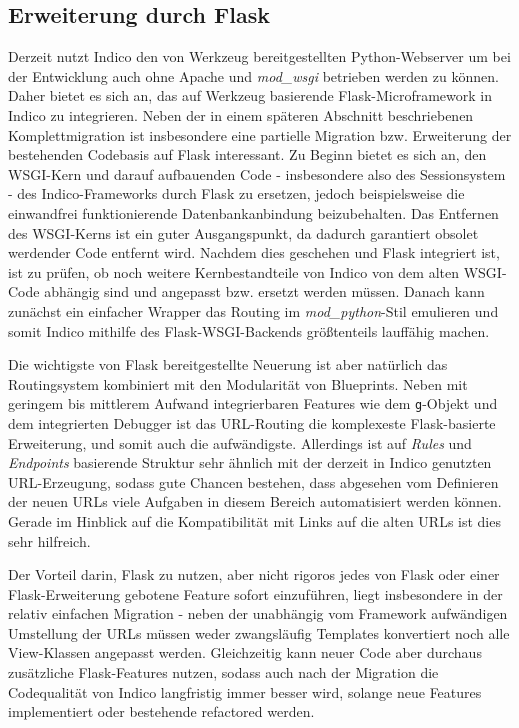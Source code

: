 \subsection{Erweiterung durch Flask}\label{migration-flask-partial}
Derzeit nutzt Indico den von Werkzeug bereitgestellten Python-Webserver um bei der Entwicklung auch
ohne Apache und \emph{mod\_wsgi} betrieben werden zu können. Daher bietet es sich an, das auf
Werkzeug basierende Flask-Microframework in Indico zu integrieren. Neben der in einem späteren
Abschnitt beschriebenen Komplettmigration ist insbesondere eine partielle Migration bzw. Erweiterung
der bestehenden Codebasis auf Flask interessant. Zu Beginn bietet es sich an, den WSGI-Kern und
darauf aufbauenden Code - insbesondere also des Sessionsystem - des Indico-Frameworks durch Flask
zu ersetzen, jedoch beispielsweise die einwandfrei funktionierende Datenbankanbindung beizubehalten.
Das Entfernen des WSGI-Kerns ist ein guter Ausgangspunkt, da dadurch garantiert obsolet werdender
Code entfernt wird. Nachdem dies geschehen und Flask integriert ist, ist zu prüfen, ob noch weitere
Kernbestandteile von Indico von dem alten WSGI-Code abhängig sind und angepasst bzw. ersetzt werden
müssen. Danach kann zunächst ein einfacher Wrapper das Routing im \emph{mod\_python}-Stil emulieren
und somit Indico mithilfe des Flask-WSGI-Backends größtenteils lauffähig machen.

Die wichtigste von Flask bereitgestellte Neuerung ist aber natürlich das Routingsystem kombiniert
mit den Modularität von Blueprints. Neben mit geringem bis mittlerem Aufwand integrierbaren Features
wie dem \lstinline{g}-Objekt und dem integrierten Debugger ist das URL-Routing die komplexeste
Flask-basierte Erweiterung, und somit auch die aufwändigste. Allerdings ist auf \emph{Rules} und
\emph{Endpoints} basierende Struktur sehr ähnlich mit der derzeit in Indico genutzten URL-Erzeugung,
sodass gute Chancen bestehen, dass abgesehen vom Definieren der neuen URLs viele Aufgaben in diesem
Bereich automatisiert werden können. Gerade im Hinblick auf die Kompatibilität mit Links auf die
alten URLs ist dies sehr hilfreich.

Der Vorteil darin, Flask zu nutzen, aber nicht rigoros jedes von Flask oder einer Flask-Erweiterung
gebotene Feature sofort einzuführen, liegt insbesondere in der relativ einfachen Migration - neben
der unabhängig vom Framework aufwändigen Umstellung der URLs müssen weder zwangsläufig Templates
konvertiert noch alle View-Klassen angepasst werden. Gleichzeitig kann neuer Code aber durchaus
zusätzliche Flask-Features nutzen, sodass auch nach der Migration die Codequalität von Indico
langfristig immer besser wird, solange neue Features implementiert oder bestehende refactored
werden.


